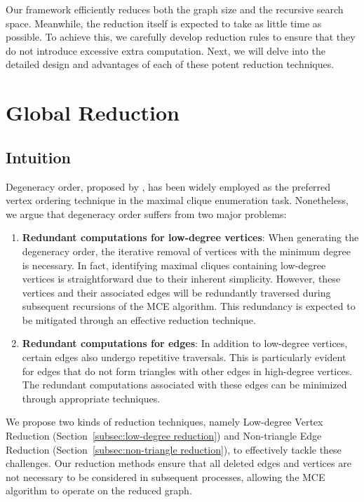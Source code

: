 \documentclass[sigconf, nonacm]{acmart}
\begin{document}
Our framework efficiently reduces both the graph size and the recursive search space. Meanwhile, the reduction itself is expected to take as little time as possible.  To achieve this, we carefully develop reduction rules to ensure that they do not introduce excessive extra computation.
Next, we will delve into the detailed design and advantages of each of these potent
reduction techniques.




\section{Global Reduction}\label{sec4}

\subsection{Intuition}

Degeneracy order, proposed by \citet{eppstein2010listing},  %
has been widely employed as the preferred vertex ordering technique in the maximal clique enumeration task. Nonetheless, we argue that degeneracy order %
suffers from two major problems:
\begin{enumerate}
    \item \textbf{Redundant computations for low-degree vertices}: When generating the degeneracy order, the iterative removal of vertices with the minimum degree is necessary. In fact, identifying maximal cliques containing low-degree vertices is straightforward due to their inherent simplicity.     
    However, these vertices and their associated edges will be redundantly traversed during subsequent recursions of the MCE algorithm. 
    This redundancy 
    is expected to be mitigated through an effective reduction technique.
    \item \textbf{Redundant computations for edges}: In addition to low-degree vertices, certain edges also undergo repetitive traversals. This is particularly evident for edges that do not form triangles with other edges in high-degree vertices. The redundant computations associated with these edges can be minimized through appropriate techniques.
\end{enumerate}

We propose two kinds of reduction techniques, namely Low-degree Vertex Reduction (Section~\ref{subsec:low-degree reduction}) and Non-triangle Edge Reduction (Section~\ref{subsec:non-triangle reduction}), to effectively tackle these challenges. Our reduction methods ensure that all deleted edges and vertices are not necessary to be considered in subsequent processes, allowing the MCE algorithm to operate on the reduced graph. 
\end{document}

